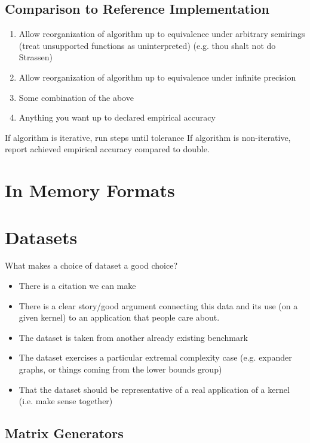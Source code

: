 \documentclass{article}
\begin{document}
\subsection{Comparison to Reference Implementation}
\begin{enumerate}
    \item Allow reorganization of algorithm up to equivalence under arbitrary semirings (treat unsupported functions as uninterpreted) (e.g. thou shalt not do Strassen)
    \item Allow reorganization of algorithm up to equivalence under infinite precision
    \item Some combination of the above
    \item Anything you want up to declared empirical accuracy
\end{enumerate}

If algorithm is iterative, run steps until tolerance
If algorithm is non-iterative, report achieved empirical accuracy compared to double.

\section{In Memory Formats}


\section{Datasets}

What makes a choice of dataset a good choice?
\begin{itemize}
    \item There is a citation we can make
    \item There is a clear story/good argument connecting this data and its use (on a given kernel) to an application that people care about.
    \item The dataset is taken from another already existing benchmark
    \item The dataset exercises a particular extremal complexity case (e.g. expander graphs, or things coming from the lower bounds group)
    \item That the dataset should be representative of a real application of a  kernel (i.e. make sense together)
\end{itemize}

\subsection{Matrix Generators}
\end{document}
